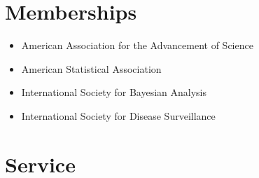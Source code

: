\documentclass[overlapped,line]{res}
\begin{document}
\begin{resume}


\section{\bf Memberships}
\begin{itemize}
\item American Association for the Advancement of Science
\item American Statistical Association
\item International Society for Bayesian Analysis
\item International Society for Disease Surveillance
\end{itemize}

\section{\bf Service}


\end{resume}
\end{document}
